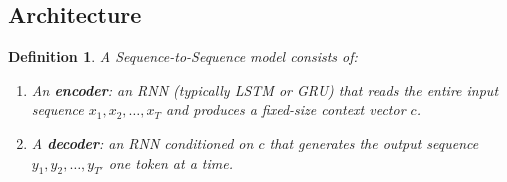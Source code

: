 \documentclass[12pt,a4paper]{article}
\newtheorem{definition}{Definition}[section]
\begin{document}
\subsection{Architecture}

\begin{definition}
A \emph{Sequence-to-Sequence model} consists of:
\begin{enumerate}[label=(\roman*)]
  \item An \textbf{encoder}: an RNN (typically LSTM or GRU) that reads the entire input sequence
        $x_1, x_2, \ldots, x_T$ and produces a fixed-size \emph{context vector} $c$.
  \item A \textbf{decoder}: an RNN conditioned on $c$ that generates the output sequence
        $y_1, y_2, \ldots, y_{T'}$ one token at a time.
\end{enumerate}
\end{definition}
\end{document}
